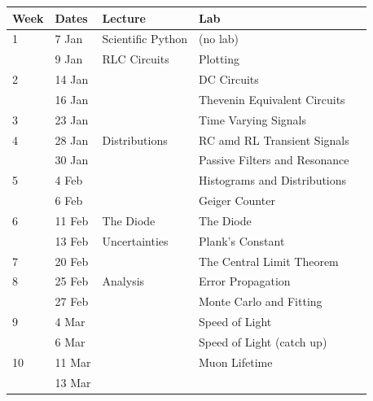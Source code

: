 \documentclass[12pt]{article}
\begin{document}
\begin{table}[h!]
\normalsize %
\begin{tabular}{ lllll }
\hline
\textbf{Week} & \textbf{Dates} & \textbf{Lecture} & \textbf{Lab} \\
\hline
1 & 7 Jan & Scientific Python & (no lab) \\
   & 9 Jan & RLC Circuits & Plotting\\
\hline
2 & 14 Jan & & DC Circuits \\
  & 16 Jan & & Thevenin Equivalent Circuits \\
\hline
3 & 23 Jan & & Time Varying Signals \\
\hline
4 & 28 Jan & Distributions & RC amd RL Transient Signals \\
   & 30 Jan & &  Passive Filters and Resonance \\
\hline
5 & 4 Feb & & Histograms and Distributions\\
   & 6 Feb & & Geiger Counter\\
\hline
6 & 11 Feb & The Diode & The Diode \\
   & 13 Feb & Uncertainties & Plank's Constant \\
\hline
7 & 20 Feb & & The Central Limit Theorem \\
\hline
8 & 25 Feb & Analysis & Error Propagation \\
   & 27 Feb & & Monte Carlo and Fitting \\
\hline
9 & 4 Mar & & Speed of Light \\
   & 6 Mar & & Speed of Light  (catch up) \\
\hline
10 & 11 Mar & & Muon Lifetime\\
   & 13 Mar & & \\
\hline
\end{tabular} 
\end{table}
\end{document}
